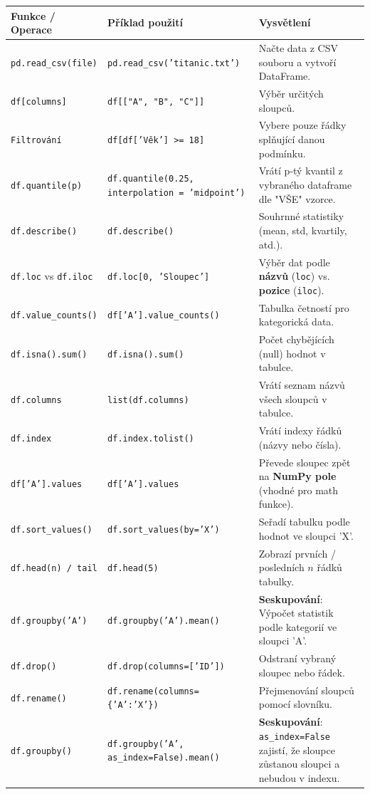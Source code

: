 \documentclass[a4paper, 11pt]{article}
\newenvironment{funkcedict}
{
\renewcommand{\arraystretch}{1.4}
\begin{tabular}{p{0.30\textwidth} p{0.32\textwidth} p{0.33\textwidth}}
\toprule
\textbf{Funkce / Operace} & \textbf{Příklad použití} & \textbf{Vysvětlení} \\
\midrule
}
{
\bottomrule
\end{tabular}
}
\begin{document}
\begin{funkcedict}
\texttt{pd.read\_csv(file)} & \texttt{pd.read\_csv('titanic.txt')} & Načte data z CSV souboru a vytvoří DataFrame. \\
\texttt{df[columns]} & \texttt{df[["A", "B", "C"]]} & Výběr určitých sloupců. \\
\texttt{Filtrování} & \texttt{df[df['Věk'] >= 18]} & Vybere pouze řádky splňující danou podmínku. \\
\texttt{df.quantile(p)} & \texttt{df.quantile(0.25, interpolation = 'midpoint')} & Vrátí p-tý kvantil z vybraného dataframe dle "VŠE" vzorce. \\
\texttt{df.describe()} & \texttt{df.describe()} & Souhrnné statistiky (mean, std, kvartily, atd.). \\
\texttt{df.loc} vs \texttt{df.iloc} & \texttt{df.loc[0, 'Sloupec']} & Výběr dat podle \textbf{názvů} (\texttt{loc}) vs. \textbf{pozice} (\texttt{iloc}). \\
\texttt{df.value\_counts()} & \texttt{df['A'].value\_counts()} & Tabulka četností pro kategorická data. \\
\texttt{df.isna().sum()} & \texttt{df.isna().sum()} & Počet chybějících (null) hodnot v tabulce. \\
\texttt{df.columns} & \texttt{list(df.columns)} & Vrátí seznam názvů všech sloupců v tabulce. \\
\texttt{df.index} & \texttt{df.index.tolist()} & Vrátí indexy řádků (názvy nebo čísla). \\
\texttt{df['A'].values} & \texttt{df['A'].values} & Převede sloupec zpět na \textbf{NumPy pole} (vhodné pro math funkce). \\
\texttt{df.sort\_values()} & \texttt{df.sort\_values(by='X')} & Seřadí tabulku podle hodnot ve sloupci 'X'. \\
\texttt{df.head(n) / tail} & \texttt{df.head(5)} & Zobrazí prvních / posledních $n$ řádků tabulky. \\
\texttt{df.groupby('A')} & \texttt{df.groupby('A').mean()} & \textbf{Seskupování}: Výpočet statistik podle kategorií ve sloupci 'A'. \\
\texttt{df.drop()} & \texttt{df.drop(columns=['ID'])} & Odstraní vybraný sloupec nebo řádek. \\
\texttt{df.rename()} & \texttt{df.rename(columns=\{'A':'X'\})} & Přejmenování sloupců pomocí slovníku. \\
\texttt{df.groupby()} & \texttt{df.groupby('A', as\_index=False).mean()} & \textbf{Seskupování}: \texttt{as\_index=False} zajistí, že sloupce zůstanou sloupci a nebudou v indexu. \\

\end{funkcedict}
\end{document}
